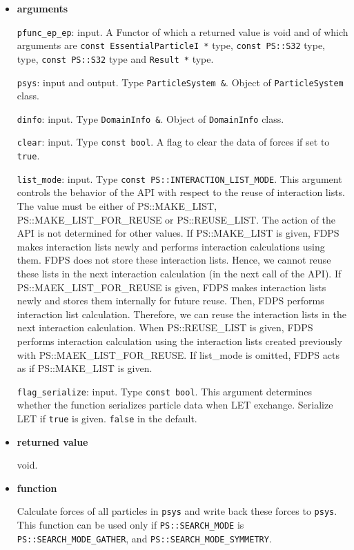 \begin{itemize}

\item {\bf arguments}

{\tt pfunc\_ep\_ep}: input. A Functor of which a returned value is
void and of which arguments are {\tt const EssentialParticleI *} type, {\tt const PS::S32} type,  type, {\tt const PS::S32} type and {\tt Result *} type.

{\tt psys}: input and output. Type {\tt ParticleSystem \&}. Object of {\tt ParticleSystem} class.

{\tt dinfo}: input. Type {\tt DomainInfo \&}. Object of {\tt DomainInfo} class.

{\tt clear}: input. Type {\tt const bool}. A flag to clear the data of forces if set to {\tt true}.

{\tt list\_mode}: input. Type {\tt const PS::INTERACTION\_LIST\_MODE}. This argument controls the behavior of the API with respect to the reuse of interaction lists. The value must be either of PS::MAKE\_LIST, PS::MAKE\_LIST\_FOR\_REUSE or PS::REUSE\_LIST. The action of the API is not determined for other values. If PS::MAKE\_LIST is given, FDPS makes interaction lists newly and performs interaction calculations using them. FDPS does not store these interaction lists. Hence, we cannot reuse these lists in the next interaction calculation (in the next call of the API). If PS::MAEK\_LIST\_FOR\_REUSE is given, FDPS makes interaction lists newly and stores them internally for future reuse. Then, FDPS performs interaction list calculation. Therefore, we can reuse the interaction lists in the next interaction calculation. When PS::REUSE\_LIST is given, FDPS performs interaction calculation using the interaction lists created previously with PS::MAEK\_LIST\_FOR\_REUSE. If list\_mode is omitted, FDPS acts as if PS::MAKE\_LIST is given.

\texttt{flag\_serialize}: input. Type \texttt{const bool}. This argument determines whether the function serializes particle data when LET exchange. Serialize LET if \texttt{true} is given. \texttt{false} in the default.

\item {\bf returned value}

void.

\item {\bf function}

Calculate forces of all particles in {\tt psys} and write back these forces to {\tt psys}. This function can be used only if {\tt PS::SEARCH\_MODE} is {\tt PS::SEARCH\_MODE\_GATHER},  and {\tt PS::SEARCH\_MODE\_SYMMETRY}.


\end{itemize}
